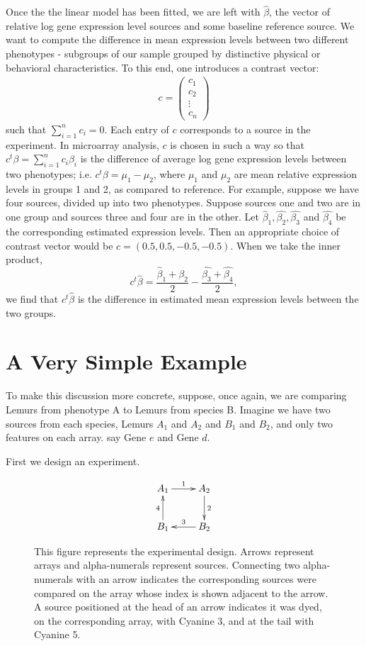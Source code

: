 Once the the linear model has been fitted, we are left with $\hat{\beta}$, the vector of relative log gene expression level sources and some baseline reference source. We want to compute the difference in mean expression levels between two different phenotypes - subgroups of our sample grouped by distinctive physical or behavioral characteristics. To this end, one introduces a contrast vector: 
\begin{eqnarray} c = \left(\begin{array}{c} 
 c_1 \\ c_2 \\ \vdots \\ c_n
 \end{array}\right)  
 \end{eqnarray}
such that  $\sum_{i=1}^n c_i = 0$. Each entry of $c$ corresponds to a source in the experiment.  In microarray analysis, $c$ is chosen in such a way so that $ c^t \beta = \sum_{i=1}^n c_i \beta_i$ is the difference of average log gene expression levels between two phenotypes; i.e. $c^t \beta = \mu_1 - \mu_2$, where $\mu_1$ and $\mu_2$ are mean relative expression levels in groups 1 and 2,  as compared to reference. For example, suppose we have four sources, divided up into two phenotypes. Suppose sources one and two are in one group and sources three and four are in the other. Let $\hat{\beta}_1, \hat{\beta_2}, \hat{\beta_3}$ and $\hat{\beta_4}$ be the corresponding estimated expression levels. Then an appropriate choice of contrast vector would be $c = (0.5, 0.5, -0.5, -0.5)$. When we take the inner product,
 \[ 
 c^t \hat{\beta} = \frac{\hat{\beta}_1 + \hat{\beta_2}}{2} - \frac{\hat{\beta_3} +\hat{\beta_4} }{2},
  \]
we find that $c^t \hat{\beta}$ is the difference in  estimated mean expression levels between the two groups. 



\section{A Very Simple Example}

To make this discussion more concrete, suppose, once again, we are comparing Lemurs from phenotype A to Lemurs from species B. Imagine we have two sources from each species, Lemurs $A_1$ and $A_2$ and $B_1$ and $B_2$, and only two features on each array. say Gene $e$ and Gene $d$.

First we design an experiment. 
\begin{figure}[h!]
\begin{eqnarray*}
\xymatrix{  
A_1 \ar[r]^1 & A_2  \ar[d]^2 \\
B_1  \ar[u]^4  & B_2 \ar[l]_3
}
\end{eqnarray*}
\caption{This figure represents the experimental design. Arrows represent arrays and alpha-numerals represent sources.  Connecting two alpha-numerals with an arrow indicates the corresponding sources were compared on the array whose index is shown adjacent to the arrow. A source positioned at the head of an arrow indicates it was dyed, on the corresponding array, with Cyanine 3, and at the tail with Cyanine 5.}
\label{SimpleExample}
\end{figure}

